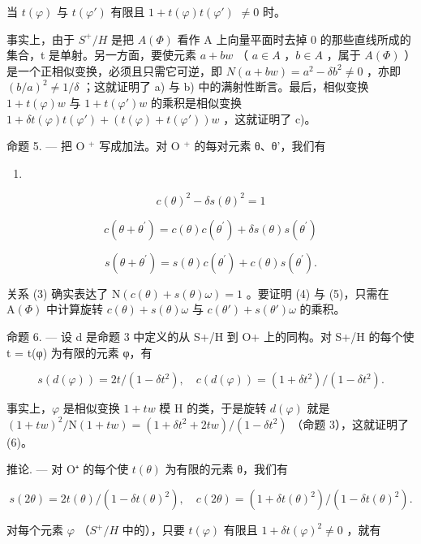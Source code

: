 当 \(t(\varphi)\) 与 \(t(\varphi')\) 有限且 \(1 + t(\varphi)t(\varphi')\) \(\neq 0\) 时。

事实上，由于 \(S^{+}/H\) 是把 \(A(\Phi)\) 看作 A 上向量平面时去掉 0 的那些直线所成的集合，t 是单射。另一方面，要使元素 \(a + bw\) （ \(a \in A\) ，\(b \in A\) ，属于 \(A(\Phi)\) ）是一个正相似变换，必须且只需它可逆，即 \(N(a + bw) = a^{2} - \delta b^{2} \neq 0\) ，亦即 \((b/a)^{2} \neq 1/\delta\) ；这就证明了 a) 与 b) 中的满射性断言。最后，相似变换 \(1 + t(\varphi)w\) 与 \(1 + t(\varphi')w\) 的乘积是相似变换 \(1 + \delta t(\varphi)t(\varphi') + (t(\varphi) + t(\varphi'))w\) ，这就证明了 c)。

命题 5. --- 把 O \(^{+}\) 写成加法。对 O \(^{+}\) 的每对元素 θ、θ'，我们有

\begin{enumerate}
\def\labelenumi{(\arabic{enumi})}
\setcounter{enumi}{2}
\tightlist
\item
\end{enumerate}

\[
c (\theta) ^ {2} - \delta s (\theta) ^ {2} = 1\tag{4}
\]

\[
c (\theta + \theta^ {\prime}) = c (\theta) c (\theta^ {\prime}) + \delta s (\theta) s (\theta^ {\prime})\tag{5}
\]

\[
s (\theta + \theta^ {\prime}) = s (\theta) c (\theta^ {\prime}) + c (\theta) s (\theta^ {\prime}).
\]

关系 (3) 确实表达了 \(\mathrm{N}(c(\theta)+s(\theta)\omega)=1\) 。要证明 (4) 与 (5)，只需在 \(\mathrm{A}(\Phi)\) 中计算旋转 \(c(\theta)+s(\theta)\omega\) 与 \(c(\theta')+s(\theta')\omega\) 的乘积。

命题 6. — 设 d 是命题 3 中定义的从 S+/H 到 O+ 上的同构。对 S+/H 的每个使 t = t(φ) 为有限的元素 φ，有

\[
s (d (\varphi)) = 2 t / (1 - \delta t ^ {2}), \quad c (d (\varphi)) = (1 + \delta t ^ {2}) / (1 - \delta t ^ {2}).\tag{6}
\]

事实上，\(\varphi\) 是相似变换 \(1 + tw\) 模 H 的类，于是旋转 \(d(\varphi)\) 就是 \((1 + tw)^2/\mathrm{N}(1 + tw) = (1 + \delta t^2 + 2tw)/(1 - \delta t^2)\) （命题 3），这就证明了 (6)。

推论. --- 对 O⁺ 的每个使 \(t(\theta)\) 为有限的元素 θ，我们有

\[
s (2 \theta) = 2 t (\theta) / (1 - \delta t (\theta) ^ {2}), \quad c (2 \theta) = (1 + \delta t (\theta) ^ {2}) / (1 - \delta t (\theta) ^ {2}). \tag {7}
\]

对每个元素 \(\varphi\) （\(S^{+}/H\) 中的），只要 \(t(\varphi)\) 有限且 \(1 + \delta t(\varphi)^{2} \neq 0\) ，就有

